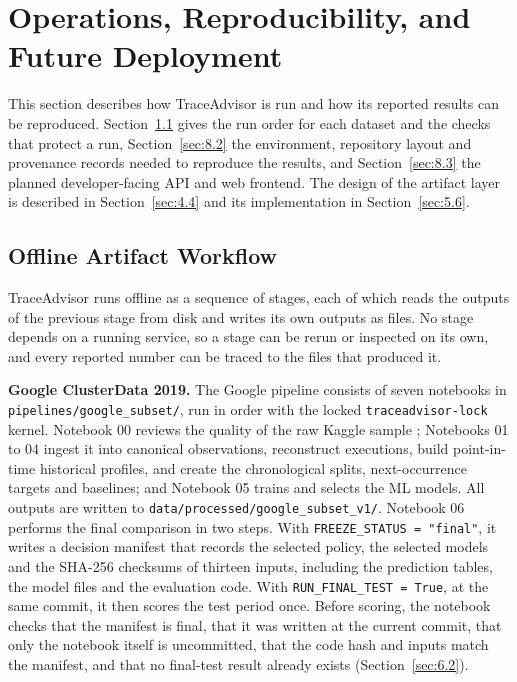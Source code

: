 \section{Operations, Reproducibility, and Future Deployment}\label{sec:8}

This section describes how TraceAdvisor is run and how its reported results can be reproduced. Section~\ref{sec:8.1} gives the run order for each dataset and the checks that protect a run, Section~\ref{sec:8.2} the environment, repository layout and provenance records needed to reproduce the results, and Section~\ref{sec:8.3} the planned developer-facing API and web frontend. The design of the artifact layer is described in Section~\ref{sec:4.4} and its implementation in Section~\ref{sec:5.6}.

\subsection{Offline Artifact Workflow}\label{sec:8.1}

TraceAdvisor runs offline as a sequence of stages, each of which reads the outputs of the previous stage from disk and writes its own outputs as files. No stage depends on a running service, so a stage can be rerun or inspected on its own, and every reported number can be traced to the files that produced it.

\textbf{Google ClusterData 2019.} The Google pipeline consists of seven notebooks in \texttt{pipelines/google\_subset/}, run in order with the locked \texttt{traceadvisor-lock} kernel. Notebook 00 reviews the quality of the raw Kaggle sample \cite{ref7}; Notebooks 01 to 04 ingest it into canonical observations, reconstruct executions, build point-in-time historical profiles, and create the chronological splits, next-occurrence targets and baselines; and Notebook 05 trains and selects the ML models. All outputs are written to \texttt{data/processed/google\_subset\_v1/}. Notebook 06 performs the final comparison in two steps. With \texttt{FREEZE\_STATUS\ =\ "final"}, it writes a decision manifest that records the selected policy, the selected models and the SHA-256 checksums of thirteen inputs, including the prediction tables, the model files and the evaluation code. With \texttt{RUN\_FINAL\_TEST\ =\ True}, at the same commit, it then scores the test period once. Before scoring, the notebook checks that the manifest is final, that it was written at the current commit, that only the notebook itself is uncommitted, that the code hash and inputs match the manifest, and that no final-test result already exists (Section~\ref{sec:6.2}).

